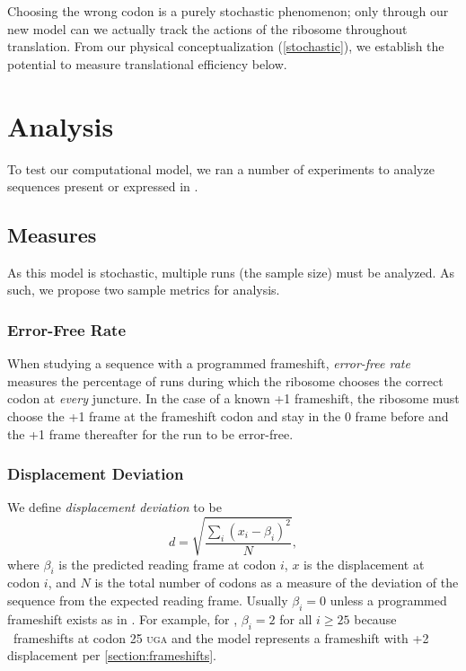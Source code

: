 \documentclass[12pt]{article}
\begin{document}
Choosing the wrong codon is a purely stochastic phenomenon; only through our new
model can we actually track the actions of the ribosome throughout
translation. From our physical conceptualization (\autoref{stochastic}),
we establish the potential to measure translational efficiency below.

\section{Analysis}
To test our computational model, we ran a number of
experiments to analyze sequences present or expressed in \ecoli.

\subsection{Measures}
\label{section:metrics}

As this model is stochastic, multiple runs (the sample size) must be analyzed.
As such, we propose two sample metrics for analysis.

\subsubsection{Error-Free Rate}
\label{section:efr}
When studying a
sequence with a programmed frameshift, \emph{error-free rate} measures the percentage of runs 
during which the ribosome chooses the correct codon
at \emph{every} juncture.  In the case of a known +1 frameshift, the ribosome must
choose the +1 frame at the frameshift codon and stay in the 0 frame before
and the +1 frame thereafter for the run to be error-free.

\subsubsection{Displacement Deviation}
\label{section:deviation}

We define \emph{displacement deviation} to be
\begin{equation}
    d = \sqrt{\frac{\sum_i (x_i - \beta_i)^2}{N}},
\end{equation}
where $\beta_i$ is the predicted reading frame at codon $i$, $x$ is
the displacement at codon $i$, and $N$ is the total number of codons
as a measure of the deviation of the sequence from the expected
reading frame.  Usually $\beta_i = 0$ unless a programmed frameshift
exists as in \prfB.  For example, for \prfB, $\beta_i = 2$
for all $i \geq 25$ because \prfB\ frameshifts at codon 25
\textsc{uga} and the model represents a frameshift with +2
displacement per \autoref{section:frameshifts}.
\end{document}
